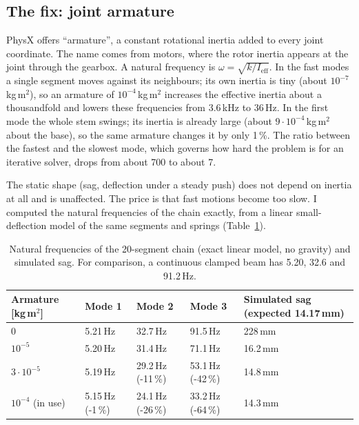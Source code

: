 \subsection{The fix: joint armature}

PhysX offers ``armature'', a constant rotational inertia added to every joint coordinate. The name comes from
motors, where the rotor inertia appears at the joint through the gearbox. A natural frequency is
$\omega = \sqrt{k / I_\text{eff}}$. In the fast modes a single segment moves against its neighbours; its own
inertia is tiny (about $10^{-7}$\,kg\,m$^2$), so an armature of $10^{-4}$\,kg\,m$^2$ increases the effective
inertia about a thousandfold and lowers these frequencies from 3.6\,kHz to 36\,Hz. In the first mode the whole
stem swings; its inertia is already large (about $9\cdot10^{-4}$\,kg\,m$^2$ about the base), so the same
armature changes it by only 1\,\%. The ratio between the fastest and the slowest mode, which governs how hard the
problem is for an iterative solver, drops from about 700 to about 7.

The static shape (sag, deflection under a steady push) does not depend on inertia at all and is unaffected. The
price is that fast motions become too slow. I computed the natural frequencies of the chain exactly, from a
linear small-deflection model of the same segments and springs (Table~\ref{tab:chain-armature}).

\begin{table}[h]
  \centering
  \caption{Natural frequencies of the 20-segment chain (exact linear model, no gravity) and simulated sag.
           For comparison, a continuous clamped beam has 5.20, 32.6 and 91.2\,Hz.}
  \label{tab:chain-armature}
  \begin{tabular}{lllll}
    \toprule
    Armature [kg\,m$^2$] & Mode 1 & Mode 2 & Mode 3 & Simulated sag (expected 14.17\,mm) \\
    \midrule
    0                  & 5.21\,Hz          & 32.7\,Hz          & 91.5\,Hz          & 228\,mm \\
    $10^{-5}$          & 5.20\,Hz          & 31.4\,Hz          & 71.1\,Hz          & 16.2\,mm \\
    $3\cdot10^{-5}$    & 5.19\,Hz          & 29.2\,Hz (-11\,\%) & 53.1\,Hz (-42\,\%) & 14.8\,mm \\
    $10^{-4}$ (in use) & 5.15\,Hz (-1\,\%) & 24.1\,Hz (-26\,\%) & 33.2\,Hz (-64\,\%) & 14.3\,mm \\
    \bottomrule
  \end{tabular}
\end{table}

